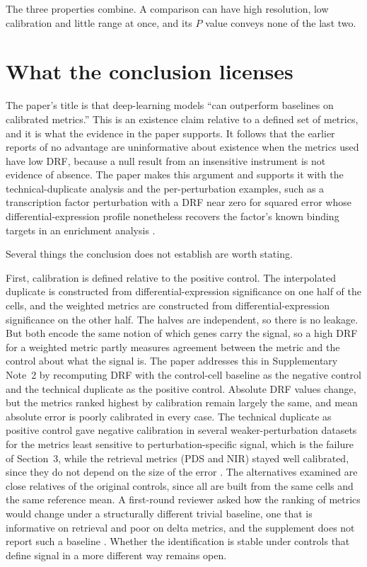 \documentclass[11pt]{article}
\theoremstyle{definition}
\begin{document}
The three properties combine. A comparison can have high resolution, low calibration and little range at once, and its $P$ value conveys none of the last two.

\section{What the conclusion licenses}

The paper's title is that deep-learning models ``can outperform baselines on calibrated metrics.'' This is an existence claim relative to a defined set of metrics, and it is what the evidence in the paper supports. It follows that the earlier reports of no advantage are uninformative about existence when the metrics used have low DRF, because a null result from an insensitive instrument is not evidence of absence. The paper makes this argument and supports it with the technical-duplicate analysis and the per-perturbation examples, such as a transcription factor perturbation with a DRF near zero for squared error whose differential-expression profile nonetheless recovers the factor's known binding targets in an enrichment analysis \citep{miller2026}.

Several things the conclusion does not establish are worth stating.

First, calibration is defined relative to the positive control. The interpolated duplicate is constructed from differential-expression significance on one half of the cells, and the weighted metrics are constructed from differential-expression significance on the other half. The halves are independent, so there is no leakage. But both encode the same notion of which genes carry the signal, so a high DRF for a weighted metric partly measures agreement between the metric and the control about what the signal is. The paper addresses this in Supplementary Note~2 by recomputing DRF with the control-cell baseline as the negative control and the technical duplicate as the positive control. Absolute DRF values change, but the metrics ranked highest by calibration remain largely the same, and mean absolute error is poorly calibrated in every case. The technical duplicate as positive control gave negative calibration in several weaker-perturbation datasets for the metrics least sensitive to perturbation-specific signal, which is the failure of Section~3, while the retrieval metrics (PDS and NIR) stayed well calibrated, since they do not depend on the size of the error \citep{miller2026supp}. The alternatives examined are close relatives of the original controls, since all are built from the same cells and the same reference mean. A first-round reviewer asked how the ranking of metrics would change under a structurally different trivial baseline, one that is informative on retrieval and poor on delta metrics, and the supplement does not report such a baseline \citep{miller2026peer}. Whether the identification is stable under controls that define signal in a more different way remains open.
\end{document}

